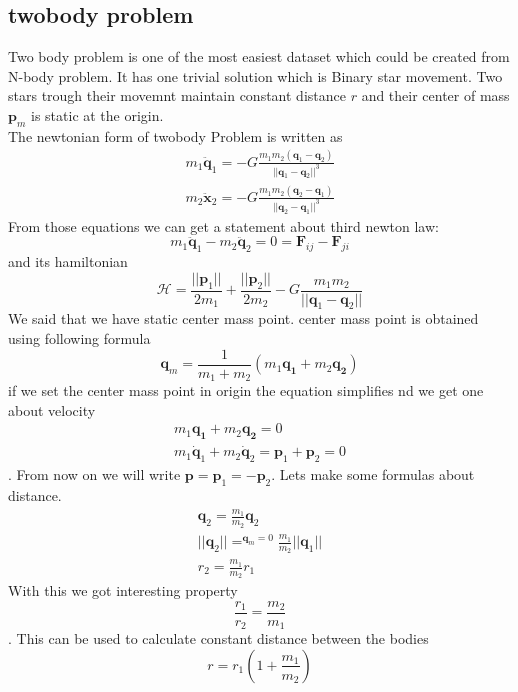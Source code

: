 \subsection{twobody problem}
Two body problem is one of the most easiest dataset which could be created from N-body problem. It has one trivial solution which is Binary star movement.
Two stars trough their movemnt maintain constant distance $r$ and their center of mass $\mathbf{p}_m$ is static at the origin.\\
The newtonian form of twobody Problem is written as
\begin{eqnarray}
	m_1\ddot{\mathbf{q}}_1 = -G\frac{m_1m_2(\mathbf{q}_1-\mathbf{q}_2)}{||\mathbf{q}_1-\mathbf{q}_2||^3}\\
	m_2\ddot{\mathbf{x}}_2 = -G\frac{m_1m_2(\mathbf{q}_2-\mathbf{q}_1)}{||\mathbf{q}_2-\mathbf{q}_1||^3}
\end{eqnarray}
From those equations we can get a statement about third newton law:
\begin{equation}
	m_1\ddot{\mathbf{q}}_1 -m_2\ddot{\mathbf{q}}_2 = 0 = \mathbf{F}_{ij} - \mathbf{F}_{ji}
\end{equation}
and its hamiltonian
\begin{equation}
\mathcal{H} = \frac{||\mathbf{p}_1||}{2m_1} +\frac{||\mathbf{p}_2||}{2m_2} - G\frac{m_1m_2}{||\mathbf{q}_1 - \mathbf{q}_2||}
\end{equation}
We said that we have static center mass point. center mass point is obtained using following formula
\begin{equation}
	\mathbf{q}_m = \frac{1}{m_1+m_2}(m_1\mathbf{q_1} + m_2\mathbf{q_2})
\end{equation}
if we set the center mass point in origin the equation simplifies nd we get one about velocity
\begin{eqnarray}
	m_1\mathbf{q_1} + m_2\mathbf{q_2} = 0\\
	m_1\dot{\mathbf{q}}_1 + m_2\dot{\mathbf{q}}_2 = \mathbf{p}_1 +\mathbf{p}_2 = 0
\end{eqnarray}.
From now on we will write $\mathbf{p} =\mathbf{p}_1 = -\mathbf{p}_2$.
Lets make some formulas about distance. 
\begin{eqnarray}
	\mathbf{q}_2 = \frac{m_1}{m_2}\mathbf{q}_2\\
	||\mathbf{q}_2|| =^{\mathbf{q}_m=0} \frac{m_1}{m_2}||\mathbf{q}_1||\\ 
	r_2 =\frac{m_1}{m_2}r_1
\end{eqnarray}
With this we got interesting property
\begin{equation}
	\frac{r_1}{r_2} =\frac{m_2}{m_1} 
\end{equation}.
This can be used to calculate constant distance between the bodies
\begin{equation}
	r=r_1\left(1 + \frac{m_1}{m_2}\right)
\end{equation}

